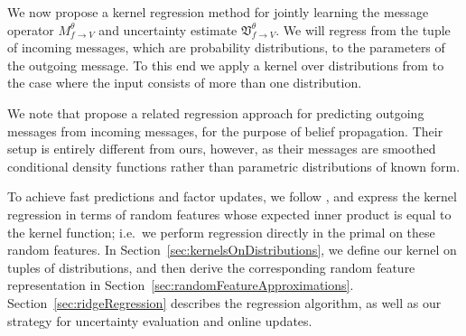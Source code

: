 \documentclass[english]{article}
\theoremstyle{plain}
\theoremstyle{plain}
\newcommand{\factor}{f}				%
\newcommand{\outV}{V}                         %
\newcommand{\approxMsg}[3]{M_{#1 \rightarrow #2}^{#3}}			%
\newcommand{\uncertaintyMsg}[3]{{\mathfrak V}_{#1 \rightarrow #2}^{#3}}			%
\newcommand{\secref}[1]{Section~\ref{#1}}
\begin{document}
We now propose a kernel regression method for jointly learning the message operator $\approxMsg{\factor}{\outV}{\theta}$ and
uncertainty estimate $\uncertaintyMsg{\factor}{\outV}{\theta}$. We will regress from the tuple of incoming messages, which
are probability distributions, to the parameters of the outgoing message. 
To this end we apply a kernel over distributions from \citep{Christmann2010} 
to the case where the input consists of more than one distribution.

We note that \citet{SonGreGue10,SonGreBicLowGue11} propose a related regression approach for predicting outgoing
messages from incoming messages, for the purpose of belief propagation. 
Their setup is entirely different from ours, however, as their messages are smoothed conditional density functions rather than parametric distributions of known form.

To achieve fast predictions and factor updates, we follow \citep{Rahimi2007,Le2013,YanSmoZonWil14}, and express the kernel regression in terms of random features whose expected inner product
is equal to the kernel function; i.e.\ we perform regression directly in the primal on these random features.
In \secref{sec:kernelsOnDistributions}, we define our kernel on tuples of distributions, and then derive the corresponding random feature representation in 
\secref{sec:randomFeatureApproximations}. \secref{sec:ridgeRegression} describes the regression algorithm, as well as our strategy for uncertainty evaluation and online updates.
\end{document}
